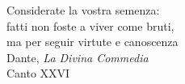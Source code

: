 \thispagestyle{empty}
\begin{flushright}

\vspace*{60mm}

Considerate la vostra semenza:\\
fatti non foste a viver come bruti,\\
ma per seguir virtute e canoscenza\\
\vspace{4mm}
Dante, \textit{La Divina Commedia}\\
Canto XXVI




\end{flushright}